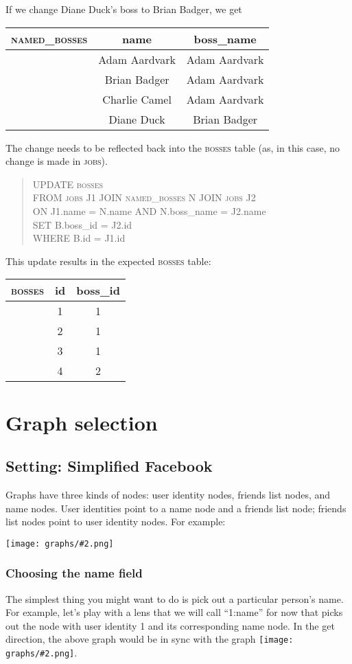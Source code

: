 \documentclass{article}
\newcommand{\scaledgraph}[2]{\texttt{[image: graphs/\#2.png]}}
\newcommand{\graph}[1]{\scaledgraph{0.5}{#1}}
\newcommand{\centeredgraph}[1]{\begin{center}\graph{#1}\end{center}}
\newcommand{\inlinegraph}[1]{\scaledgraph{0.2}{#1}}
\begin{document}
If we change Diane Duck's boss to Brian Badger, we get
\begin{center} \begin{tabular} {c | c c }
    \textsc{named\_bosses} & name & boss\_name \\
    \hline
    & Adam Aardvark & Adam Aardvark \\
    & Brian Badger & Adam Aardvark \\
    & Charlie Camel & Adam Aardvark \\
    & Diane Duck & Brian Badger
\end{tabular} \end{center}
The change needs to be reflected back into the \textsc{bosses}
table (as, in this case, no change is made in \textsc{jobs}).
\begin{quote}
    UPDATE \textsc{bosses} \\
    FROM \textsc{jobs} J1 JOIN \textsc{named\_bosses} N JOIN \textsc{jobs} J2 \\
    ON J1.name = N.name AND N.boss\_name = J2.name \\
    SET B.boss\_id = J2.id \\
    WHERE B.id = J1.id
\end{quote}
This update results in the expected \textsc{bosses} table:
\begin{center} \begin{tabular} {c | c c }
    \textsc{bosses} & id & boss\_id \\
    \hline
    & 1 & 1 \\
    & 2 & 1 \\
    & 3 & 1 \\
    & 4 & 2 
\end{tabular} \end{center}


\section{Graph selection}
\subsection*{Setting: Simplified Facebook}
Graphs have three kinds of nodes: user identity nodes, friends list nodes,
and name nodes. User identities point to a name node and a friends list
node; friends list nodes point to user identity nodes. For example:

\centeredgraph{facebook-start}

\subsubsection*{Choosing the name field}
The simplest thing you might want to do is pick out a particular person's
name. For example, let's play with a lens that we will call ``1:name'' for
now that picks out the node with user identity 1 and its corresponding name
node. In the get direction, the above graph would be in sync with the graph
\inlinegraph{facebook-name-dw}.
\end{document}
